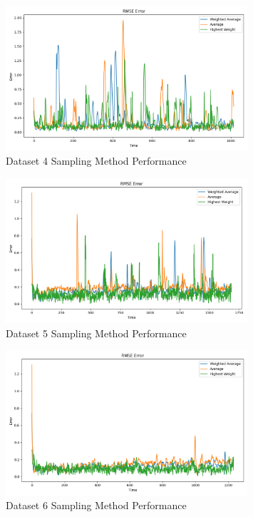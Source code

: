 \documentclass{article}
\begin{document}
\begin{figure}[H]
    \centering
    \includegraphics[width=0.8\textwidth]{./imgs/task2/studentdata4_rmse_methods.png}
    \caption{Dataset 4 Sampling Method Performance}
\end{figure}

\begin{figure}[H]
    \centering
    \includegraphics[width=0.8\textwidth]{./imgs/task2/studentdata5_rmse_methods.png}
    \caption{Dataset 5 Sampling Method Performance}
\end{figure}

\begin{figure}[H]
    \centering
    \includegraphics[width=0.8\textwidth]{./imgs/task2/studentdata6_rmse_methods.png}
    \caption{Dataset 6 Sampling Method Performance}
\end{figure}
\end{document}
